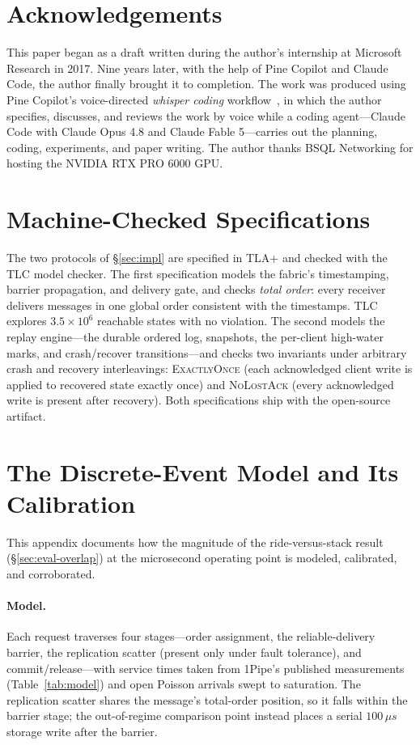 \section*{Acknowledgements}
This paper began as a draft written during the author's internship at Microsoft Research in 2017.
Nine years later, with the help of Pine Copilot and Claude Code, the author finally brought it to completion.
The work was produced using Pine Copilot's voice-directed \emph{whisper coding}
workflow~\citep{pineai2026whispercoding}, in which the author specifies, discusses, and reviews
the work by voice while a coding agent---Claude Code with Claude Opus 4.8 and Claude Fable
5---carries out the planning, coding, experiments, and paper writing.
The author thanks BSQL Networking for hosting the NVIDIA RTX PRO 6000 GPU.




\appendix

\section{Machine-Checked Specifications}
\label{app:tla}
The two protocols of \S\ref{sec:impl} are specified in TLA+ and checked
with the TLC model checker. The first specification models the fabric's
timestamping, barrier propagation, and delivery gate, and checks
\emph{total order}: every receiver delivers messages in one global order
consistent with the timestamps. TLC explores $3.5\times10^{6}$ reachable
states with no violation. The second models the replay
engine---the durable ordered log, snapshots, the per-client high-water
marks, and crash/recover transitions---and checks two invariants under
arbitrary crash and recovery interleavings: \textsc{ExactlyOnce} (each
acknowledged client write is applied to recovered state exactly once) and
\textsc{NoLostAck} (every acknowledged write is present after recovery).
Both specifications ship with the open-source artifact.

\section{The Discrete-Event Model and Its Calibration}
\label{app:model}

This appendix documents how the magnitude of the ride-versus-stack
result (\S\ref{sec:eval-overlap}) at the microsecond operating point is
modeled, calibrated, and corroborated.

\paragraph{Model.} Each request traverses four stages---order assignment,
the reliable-delivery barrier, the replication scatter (present only under
fault tolerance), and commit/release---with service times taken from
1Pipe's published measurements (Table~\ref{tab:model}) and open Poisson
arrivals swept to saturation. The replication scatter shares the message's
total-order position, so it falls within the barrier stage; the
out-of-regime comparison point instead places a serial $100\,\mu s$
storage write after the barrier.

